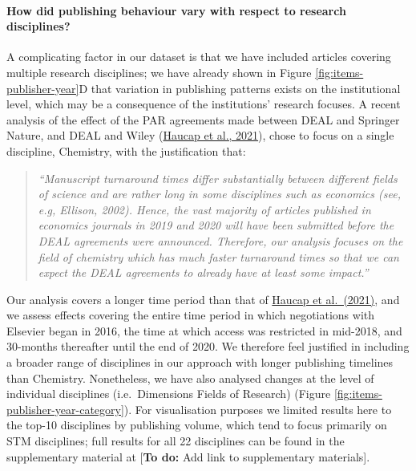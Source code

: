 \documentclass[
]{article}
\begin{document}
\hypertarget{how-did-publishing-behaviour-vary-with-respect-to-research-disciplines}{%
\paragraph{How did publishing behaviour vary with respect to research disciplines?}\label{how-did-publishing-behaviour-vary-with-respect-to-research-disciplines}}

A complicating factor in our dataset is that we have included articles covering multiple research disciplines; we have already shown in Figure \ref{fig:items-publisher-year}D that variation in publishing patterns exists on the institutional level, which may be a consequence of the institutions' research focuses. A recent analysis of the effect of the PAR agreements made between DEAL and Springer Nature, and DEAL and Wiley (\href{https://www.dice.hhu.de/fileadmin/redaktion/Fakultaeten/Wirtschaftswissenschaftliche_Fakultaet/DICE/Discussion_Paper/360_Haucap_Moshgbar_Schmal.pdf}{Haucap et al., 2021}), chose to focus on a single discipline, Chemistry, with the justification that:

\begin{quote}
\emph{``Manuscript turnaround times differ substantially between different fields of science and are rather long in some disciplines such as economics (see, e.g, Ellison, 2002). Hence, the vast majority of articles published in economics journals in 2019 and 2020 will have been submitted before the DEAL agreements were announced. Therefore, our analysis focuses on the field of chemistry which has much faster turnaround times so that we can expect the DEAL agreements to already have at least some impact.''}
\end{quote}

Our analysis covers a longer time period than that of \href{https://www.dice.hhu.de/fileadmin/redaktion/Fakultaeten/Wirtschaftswissenschaftliche_Fakultaet/DICE/Discussion_Paper/360_Haucap_Moshgbar_Schmal.pdf}{Haucap et al.~(2021)}, and we assess effects covering the entire time period in which negotiations with Elsevier began in 2016, the time at which access was restricted in mid-2018, and 30-months thereafter until the end of 2020. We therefore feel justified in including a broader range of disciplines in our approach with longer publishing timelines than Chemistry. Nonetheless, we have also analysed changes at the level of individual disciplines (i.e.~Dimensions Fields of Research) (Figure \ref{fig:items-publisher-year-category}). For visualisation purposes we limited results here to the top-10 disciplines by publishing volume, which tend to focus primarily on STM disciplines; full results for all 22 disciplines can be found in the supplementary material at {[}\textbf{To do:} Add link to supplementary materials{]}.
\end{document}
